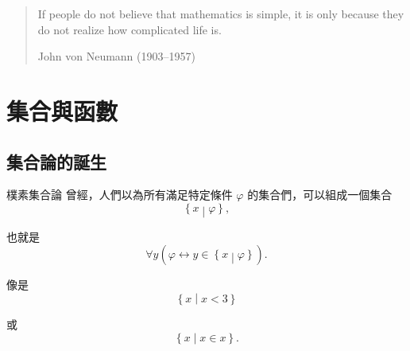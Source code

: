 \documentclass{Slideshow}
\begin{document}

\begin{frame}
    \begin{quote}
        If people do not believe that mathematics is simple, it is only because
        they do not realize how complicated life is.

        \begin{flushright}
            \textup{John von Neumann (1903--1957)}
        \end{flushright}
    \end{quote}
\end{frame}

\section{集合與函數}
\subsection{集合論的誕生}
\begin{frame}{樸素集合論}
    曾經，人們以為所有滿足特定條件 $\varphi$ 的集合們，可以組成一個集合
    \[ \left\{ x \middle| \varphi \right\},\]

    也就是
    \[ \forall y \left( \varphi \leftrightarrow y \in \left\{ x \middle| \varphi \right\} \right).\]

    像是
    \[ \left\{ x \middle| x < 3 \right\} \]

    或
    \[ \left\{ x \middle| x \in x \right\}.\]
\end{frame}
\end{document}
